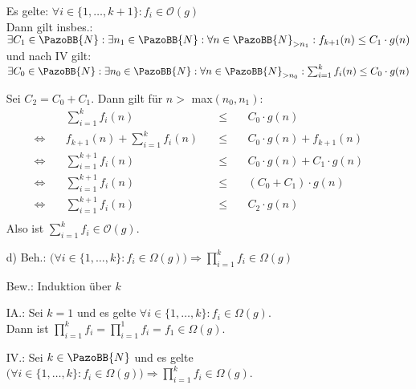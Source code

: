 \documentclass[12pt]{article}
\newcommand {\N}{\PazoBB{N}}   %
\newcommand {\Om}{\mathcal{O}} %
\begin{document}
\begin{enumerate}
                      Es gelte: $\forall i\in\{1, \dots, k+1\} : f_i \in \Om(g)$\\
                      Dann gilt insbes.: $\exists C_1 \in \N : \exists n_1\in \N : \forall n \in\N_{>n_1} : f_{k+1}(n)  \leq C_1 \cdot g(n)$ \\
                      und nach IV gilt: $\exists C_0 \in \N : \exists n_0\in \N : \forall n \in\N_{>n_0} :  \sum^k_{i=1} f_i(n)  \leq C_0\cdot g(n)$

                     Sei $C_2 = C_0 + C_1$. Dann gilt für $n>$ max$(n_0, n_1)$:
                      \begin{align*}
                                                                        &  \sum^k_{i=1} f_i (n)                               & \quad \leq  \quad& C_0\cdot g(n)                               \\  
                          \Longleftrightarrow  \quad    &  f_{k+1}(n)  + \sum^k_{i=1} f_i (n)          & \quad \leq  \quad &C_0\cdot g(n)   + f_{k+1}(n)                              \\
                          \Longleftrightarrow  \quad    &   \sum^{k+1}_{i=1} f_i (n)                    & \quad \leq  \quad& C_0\cdot g(n)   +       C_1 \cdot g(n)                         \\
                          \Longleftrightarrow  \quad    &   \sum^{k+1}_{i=1} f_i (n)               & \quad \leq  \quad& (C_0 +  C_1) \cdot g(n)                         \\
                          \Longleftrightarrow  \quad    &   \sum^{k+1}_{i=1} f_i (n)                & \quad \leq  \quad &C_2 \cdot g(n)                         \\
                      \end{align*}
                     Also ist $ \sum^k_{i=1} f_i \in\Om(g)$.


\item[d) Beh.:] 
          $\big( \forall i\in\{1, \dots, k\} : f_i \in \Omega(g) \big) \Longrightarrow \prod^k_{i=1} f_i \in\Omega(g)$
\item[Bew.:] Induktion über $k$
\item[IA.:] Sei $k=1$ und es gelte $\forall i\in\{1, \dots, k\} : f_i \in \Omega(g)$.\\
                  Dann ist  $\prod^k_{i=1} f_i = \prod^1_{i=1} f_i = f_1 \in \Omega(g)$.
\item[IV.:] Sei $k\in \N$  und es gelte $\big( \forall i\in\{1, \dots, k\} : f_i \in \Omega(g) \big) \Longrightarrow \prod^k_{i=1} f_i \in\Omega(g)$.


\end{enumerate}
\end{document}
